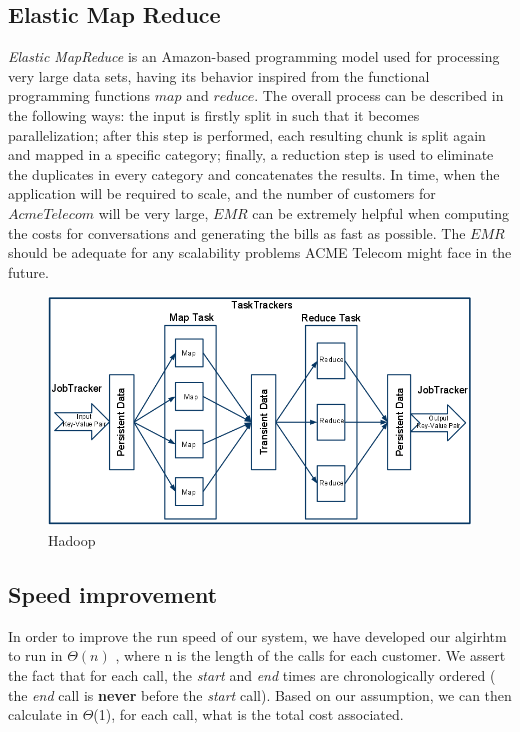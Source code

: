 \documentclass[11pt,twocolumn]{article} %
\begin{document}
\subsection{Elastic Map Reduce}
\emph{Elastic MapReduce} is an Amazon-based programming model used for processing very large data sets, 
having its behavior inspired from the functional programming functions $map$ and $reduce$. 
The overall process can be described in the following ways: the input is firstly split in such that it becomes parallelization; 
after this step is performed, each resulting chunk is split again and mapped in a specific category; 
finally, a reduction step is used to eliminate the duplicates in every category and concatenates the results. 
In time, when the application will be required to scale, and the number of customers for $AcmeTelecom$ will be very large, $EMR$ can be extremely 
helpful when computing the costs for conversations and generating the bills as fast as possible. The $EMR$ should be adequate for any 
scalability problems ACME Telecom might face in the future.
\begin{figure}[ht]
\includegraphics[scale=0.25]{hadoop.png}
\caption{Hadoop \cite{hadoop}}
\end{figure}

\subsection{Speed improvement}

In order to improve the run speed of our system, we have developed our algirhtm to run in $\Theta(n)$
, where n is the length of the calls for each customer. We assert the fact that for each call,
the \textit{start} and \textit{end} times are chronologically ordered ( the \textit{end} call is \textbf{never}
before the \textit{start} call). Based on our assumption, we can then calculate in $\Theta$(1), for each call,
what is the total cost associated. 
\end{document}
